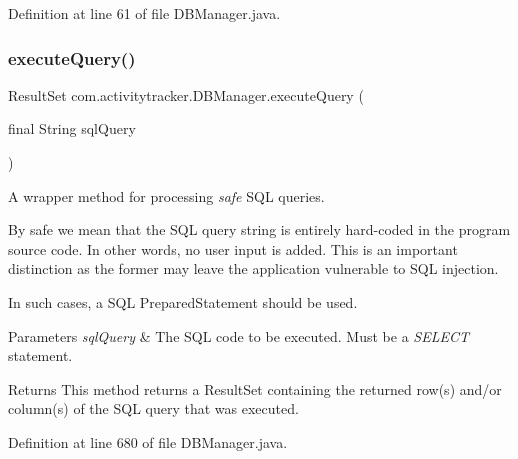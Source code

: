 Definition at line 61 of file D\+B\+Manager.\+java.

\mbox{\label{classcom_1_1activitytracker_1_1_d_b_manager_adef71a18dc05536d80e83311841e1953}} 
\subsubsection{\texorpdfstring{execute\+Query()}{executeQuery()}}
{\footnotesize\ttfamily Result\+Set com.\+activitytracker.\+D\+B\+Manager.\+execute\+Query (\begin{DoxyParamCaption}\item[{final String}]{sql\+Query }\end{DoxyParamCaption})\hspace{0.3cm}{\ttfamily [private]}}

A wrapper method for processing {\itshape safe} S\+QL queries.

By safe we mean that the S\+QL query string is entirely hard-\/coded in the program source code. In other words, no user input is added. This is an important distinction as the former may leave the application vulnerable to S\+QL injection.

In such cases, a S\+QL Prepared\+Statement should be used.


\begin{DoxyParams}{Parameters}
{\em sql\+Query} & The S\+QL code to be executed. Must be a {\itshape S\+E\+L\+E\+CT} statement.\\
\hline
\end{DoxyParams}
\begin{DoxyReturn}{Returns}
This method returns a Result\+Set containing the returned row(s) and/or column(s) of the S\+QL query that was executed. 
\end{DoxyReturn}


Definition at line 680 of file D\+B\+Manager.\+java.

\mbox{\label{classcom_1_1activitytracker_1_1_d_b_manager_a382397e2bdf309901d1c80ff66be69b7}} 
